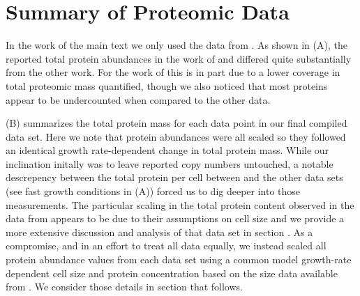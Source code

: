 \section{Summary of Proteomic Data}
\label{sec:SI_data_summary}

In the work of the main text we only used the data from \cite{valgepea2013,
li2014, peebo2015, schmidt2016}. As shown in (A), the
reported total protein abundances in the work of \cite{taniguchi2010} and
\cite{soufi2015} differed quite substantially from the other work. For the work
of \cite{taniguchi2010} this is in part due to a lower coverage in total
proteomic mass quantified, though we also noticed that most proteins appear to
be undercounted when compared to the other data.

(B) summarizes the total protein mass for each data
point in our final compiled data set. Here we note that protein abundances were
all scaled so they followed an identical growth rate-dependent change in total
protein mass.  While our inclination initally was to leave reported copy numbers
untouched,  a notable descrepency between the total protein per cell between
\cite{schmidt2016} and the other data sets (see fast growth conditions in
(A)) forced us to dig deeper into those measurements.
The particular scaling in the total protein content observed in the data from
\cite{schmidt2016}  appears to be due to their assumptions on cell size and we
provide a more extensive discussion and analysis of that data set in section
. As a compromise, and in an effort to treat all data
equally, we instead scaled all protein abundance values from each data set using
a common model growth-rate dependent cell size and protein concentration based
on the size data available from \cite{si2017}. We consider those details in
section  that follows.

